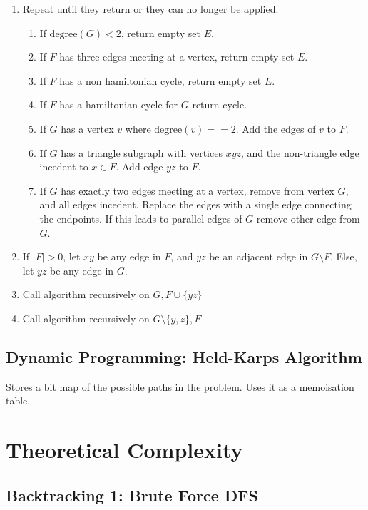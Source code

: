 \begin{enumerate}
    \item Repeat until they return or they can no longer be applied.
    \begin{enumerate}
        \item If $\text{degree}(G) < 2$, return empty set $E$.
        \item If $F$ has three edges meeting at a vertex, return empty set $E$.
        \item If $F$ has a non hamiltonian cycle, return empty set $E$.
        \item If $F$ has a hamiltonian cycle for $G$ return cycle.
        \item If $G$ has a vertex $v$ where $\text{degree}(v) == 2$. Add the
            edges of $v$ to $F$.
        \item If $G$ has a triangle subgraph with vertices $xyz$, and the
            non-triangle edge incedent to $x \in F$. Add edge $yz$ to $F$.
        \item If $G$ has exactly two edges meeting at a vertex, remove from
            vertex $G$, and all edges incedent. Replace the edges with a single
            edge connecting the endpoints. If this leads to parallel edges of
            $G$ remove other edge from $G$.
    \end{enumerate}
    \item If $|F| > 0$, let $xy$ be any edge in $F$, and $yz$ be an adjacent
        edge in $G \setminus F$. Else, let $yz$ be any edge in $G$.
    \item Call algorithm recursively on $G, F \cup \{yz\}$
    \item Call algorithm recursively on $G \setminus \{y,z\}, F$
\end{enumerate}

\subsection{Dynamic Programming: Held-Karps Algorithm}

Stores a bit map of the possible paths in the problem. Uses it as a memoisation
table.

\newpage

\section{Theoretical Complexity}

\subsection{Backtracking 1: Brute Force DFS}


